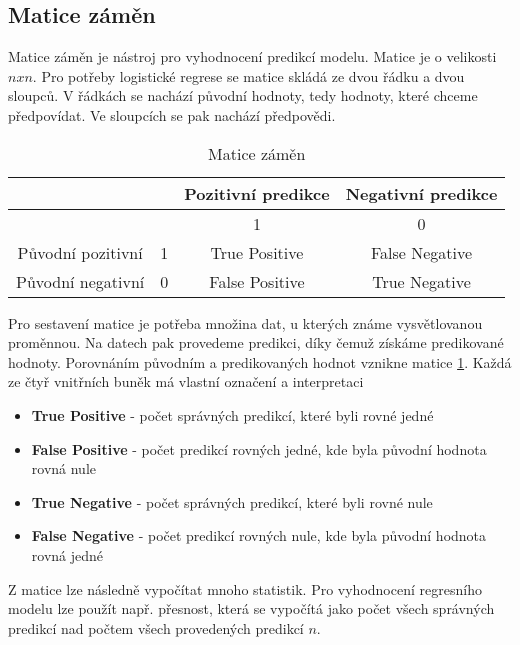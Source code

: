 \newpage
{\color{red}
\subsection{Matice záměn}
Matice záměn je nástroj pro vyhodnocení predikcí modelu. Matice je o velikosti $n x n$. Pro potřeby logistické regrese se matice skládá ze dvou řádku a dvou sloupců.
V řádkách se nachází původní hodnoty, tedy hodnoty, které chceme předpovídat. Ve sloupcích se pak nachází předpovědi.  

\begin{table}[H]
    \centering
    \begin{tabular}{|c|c|c|c|}
        \hline
                        &   & Pozitivní predikce & Negativní predikce \\ \hline
                        &   & 1                  & 0                  \\ \hline
        Původní pozitivní & 1 & True Positive      & False Negative     \\ \hline
        Původní negativní & 0 & False Positive     & True Negative      \\ \hline
    \end{tabular}
    \caption{\label{tab:matice_zamen}Matice záměn}
\end{table}

Pro sestavení matice je potřeba množina dat, u kterých známe vysvětlovanou proměnnou. Na datech pak provedeme predikci, díky čemuž získáme predikované hodnoty. Porovnáním
původním a predikovaných hodnot vznikne matice \ref{tab:matice_zamen}. Každá ze čtyř vnitřních buněk má vlastní označení a interpretaci

\begin{itemize}
    \item \textbf{True Positive} - počet správných predikcí, které byli rovné jedné
    \item \textbf{False Positive} - počet predikcí rovných jedné, kde byla původní hodnota rovná nule
    \item \textbf{True Negative} - počet správných predikcí, které byli rovné nule
    \item \textbf{False Negative} - počet predikcí rovných nule, kde byla původní hodnota rovná jedné
\end{itemize}

Z matice lze následně vypočítat mnoho statistik. Pro vyhodnocení regresního modelu lze použít např. přesnost, která se vypočítá jako počet všech správných predikcí nad
počtem všech provedených predikcí $n$.

}
